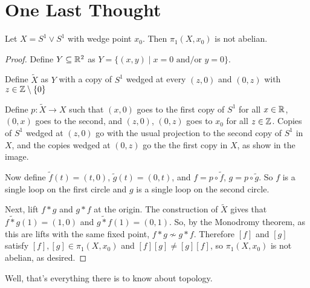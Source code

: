 \section{One Last Thought}
\begin{example}
Let $X = S^1 \vee S^1$ with wedge point $x_0$.  Then $\pi_1(X, x_0)$ is not abelian.
\end{example}
\begin{proof}
Define $Y \subseteq \mathbb R^2$ as $Y = \{ (x,y) \mid x = 0 \text{ and/or } y = 0\}$.

Define $\widetilde{X}$ as $Y$ with a copy of $S^1$ wedged at every $(z,0)$ and $(0,z)$ with $z \in \mathbb Z \setminus \{0\}$

Define $p : \widetilde{X} \to X$ such that $(x,0)$ goes to the first copy of $S^1$ for all $x \in \mathbb R$, $(0,x)$ goes to the second, and $(z,0)$, $(0,z)$ goes to $x_0$ for all $z \in \mathbb Z$.  Copies of $S^1$ wedged at $(z,0)$ go with the usual projection to the second copy of $S^1$ in $X$, and the copies wedged at $(0,z)$ go the the first copy in $X$, as show in the image.
\placeholder

Now define $\widetilde{f}(t) = (t,0)$, $\widetilde{g}(t) = (0,t)$, and $f = p \circ \widetilde{f}$, $g = p \circ \widetilde{g}$.  So $f$ is a single loop on the first circle and $g$ is a single loop on the second circle.

Next, lift $f * g$ and $g * f$ at the origin.  The construction of $\widetilde{X}$ gives that $\widetilde{f * g}(1) = (1,0)$ and $\widetilde{g * f}(1) = (0,1)$.  So, by the Monodromy theorem, as this are lifts with the same fixed point, $f * g \not \sim g * f$.  Therefore $[f]$ and $[g]$ satisfy $[f],[g] \in \pi_1(X,x_0)$ and $[f][g] \neq [g][f]$, so $\pi_1(X,x_0)$ is not abelian, as desired.

\end{proof}

Well, that's everything there is to know about topology.  



